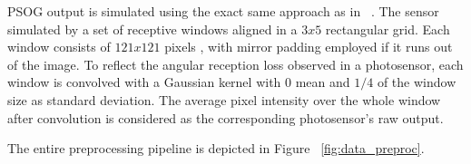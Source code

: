 PSOG output is simulated using the exact same approach as in ~\cite{zemblys2018making}. The sensor simulated by a set of receptive windows aligned in a $3x5$ rectangular grid. Each window consists of $121x121$ pixels , with mirror padding employed if it runs out of the image. To reflect the angular reception loss observed in a photosensor, each window is convolved with a Gaussian kernel with $0$ mean and $1/4$ of the window size as standard deviation. The average pixel intensity over the whole window after convolution is considered as the corresponding photosensor's raw output. 

The entire preprocessing pipeline is depicted in Figure ~\ref{fig:data_preproc}.


